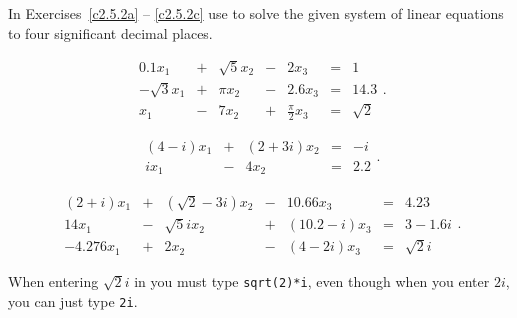 \documentclass{ximera}
\begin{document}
\CEXER

\noindent In Exercises~\ref{c2.5.2a} -- \ref{c2.5.2c} use \Matlab to
solve the given system of linear equations to four significant decimal places.
\begin{exercise} \label{c2.5.2a}
\[
\begin{array}{rcrcrcr}
     0.1 x_1 & + & \sqrt{5}x_2 & - &   2 x_3 & = & 1 \\
-\sqrt{3}x_1 & + &     \pi x_2 & - & 2.6 x_3 & = & 14.3 \\
         x_1 & - &       7 x_2 & + & \frac{\pi}{2}x_3 & = & \sqrt{2}
\end{array}.
\]
\end{exercise}
\begin{exercise} \label{c2.5.2b}
\[
\begin{array}{rcrcr}
(4-i)x_1 & + & (2+3i)x_2 & = &  -i \\
   i x_1 & - &     4 x_2 & = & 2.2
\end{array}.
\]
\end{exercise}
\begin{exercise} \label{c2.5.2c}
\[
\begin{array}{rcrcrcr}
 (2+i) x_1 & + & (\sqrt{2}-3i)x_2 & - &    10.66 x_3 & = &     4.23 \\
    14 x_1 & - &    \sqrt{5}i x_2 & + & (10.2-i) x_3 & = &    3-1.6i \\
-4.276 x_1 & + &            2 x_2 & - &   (4-2i) x_3 & = & \sqrt{2}i
\end{array}.
\]

  When entering $\sqrt{2}i$ in \Matlab you must type
{\tt sqrt(2)*i}, even though when you enter $2i$, you can just type
{\tt 2i}.
\end{exercise}
\end{document}
